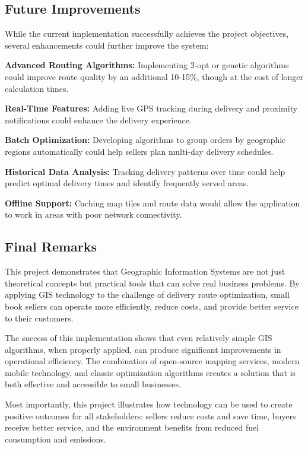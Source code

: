 \documentclass[12pt,a4paper]{article}
\begin{document}
\subsection{Future Improvements}

While the current implementation successfully achieves the project objectives, several enhancements could further improve the system:

\textbf{Advanced Routing Algorithms:} Implementing 2-opt or genetic algorithms could improve route quality by an additional 10-15\%, though at the cost of longer calculation times.

\textbf{Real-Time Features:} Adding live GPS tracking during delivery and proximity notifications could enhance the delivery experience.

\textbf{Batch Optimization:} Developing algorithms to group orders by geographic regions automatically could help sellers plan multi-day delivery schedules.

\textbf{Historical Data Analysis:} Tracking delivery patterns over time could help predict optimal delivery times and identify frequently served areas.

\textbf{Offline Support:} Caching map tiles and route data would allow the application to work in areas with poor network connectivity.

\subsection{Final Remarks}

This project demonstrates that Geographic Information Systems are not just theoretical concepts but practical tools that can solve real business problems. By applying GIS technology to the challenge of delivery route optimization, small book sellers can operate more efficiently, reduce costs, and provide better service to their customers.

The success of this implementation shows that even relatively simple GIS algorithms, when properly applied, can produce significant improvements in operational efficiency. The combination of open-source mapping services, modern mobile technology, and classic optimization algorithms creates a solution that is both effective and accessible to small businesses.

Most importantly, this project illustrates how technology can be used to create positive outcomes for all stakeholders: sellers reduce costs and save time, buyers receive better service, and the environment benefits from reduced fuel consumption and emissions.
\end{document}
